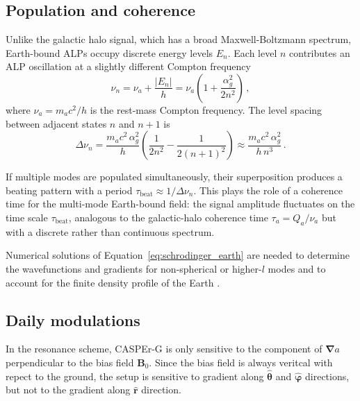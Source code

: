 \subsection{Population and coherence}\label{sec:theory:earthALP:coherence}

Unlike the galactic halo signal, which has a broad Maxwell-Boltzmann spectrum, Earth-bound ALPs occupy discrete energy levels $E_n$. Each level $n$ contributes an ALP oscillation at a slightly different Compton frequency
\begin{equation}
    \nu_n = \nu_a + \frac{|E_n|}{h}
    = \nu_a\left(1 + \frac{\alpha_g^2}{2n^2}\right)
    \,,\label{eq:nu_bound}
\end{equation}
where $\nu_a = m_a c^2/h$ is the rest-mass Compton frequency. The level spacing between adjacent states $n$ and $n+1$ is
\begin{equation}
    \Delta\nu_n = \frac{m_a c^2\,\alpha_g^2}{h}\left(\frac{1}{2n^2} - \frac{1}{2(n+1)^2}\right)
    \approx \frac{m_a c^2\,\alpha_g^2}{h\,n^3}
    \,.\label{eq:level_spacing}
\end{equation}

If multiple modes are populated simultaneously, their superposition produces a beating pattern with a period $\tau_\mathrm{beat} \approx 1/\Delta\nu_n$. This plays the role of a coherence time for the multi-mode Earth-bound field: the signal amplitude fluctuates on the time scale $\tau_\mathrm{beat}$, analogous to the galactic-halo coherence time $\tau_a = Q_a/\nu_a$ but with a discrete rather than continuous spectrum.

Numerical solutions of Equation~\eqref{eq:schrodinger_earth} are needed to determine the wavefunctions and gradients for non-spherical or higher-$l$ modes and to account for the finite density profile of the Earth .


\subsection{Daily modulations}\label{sec:theory:earthALP:daily}




In the resonance scheme, CASPEr-G is only sensitive to the component of $\boldsymbol{\nabla}a$ perpendicular to the bias field $\mathbf{B}_0$. 
Since the bias field is always veritcal with repect to the ground, the setup is sensitive to gradient along $\hat{\boldsymbol{\theta}}$ and $\hat{\boldsymbol{\varphi}}$ directions, but not to the gradient along $\hat{\mathbf{r}}$ direction.


